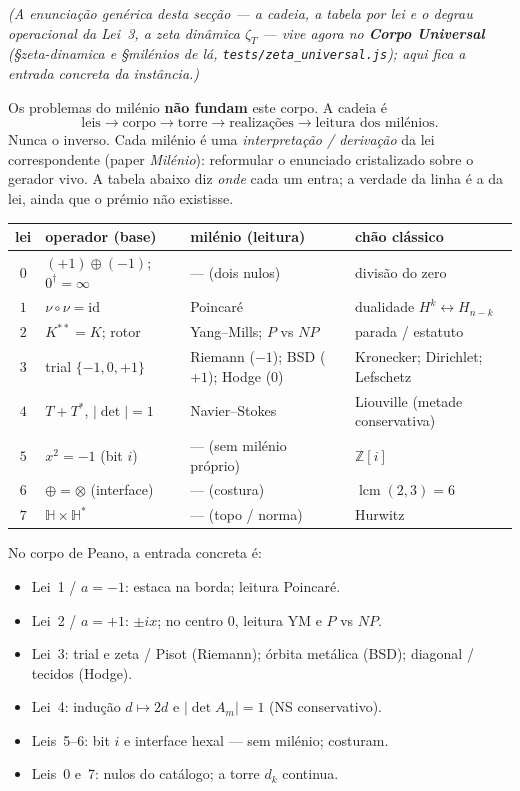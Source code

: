 \documentclass[11pt,a4paper]{article}
\newcommand{\code}[1]{\texttt{#1}}
\begin{document}
\noindent\emph{(A enunciação genérica desta secção --- a cadeia, a
tabela por lei e o degrau operacional da Lei~3, a zeta dinâmica
$\zeta_{T}$ --- vive agora no \textbf{Corpo Universal}
(\S zeta-dinamica e \S milénios de lá, \code{tests/zeta\_universal.js});
aqui fica a entrada concreta da instância.)}

Os problemas do milénio \textbf{não fundam} este corpo.
A cadeia é
\[\text{leis}\to\text{corpo}\to\text{torre}\to\text{realizações}\to\text{leitura dos milénios}.\]
Nunca o inverso. Cada milénio é uma \emph{interpretação / derivação}
da lei correspondente (paper \emph{Milénio}): reformular o enunciado
cristalizado sobre o gerador vivo.
A tabela abaixo diz \emph{onde} cada um entra; a verdade da linha é a
da lei, ainda que o prémio não existisse.

\begin{center}\small
\begin{tabular}{@{}clll@{}}
lei & operador (base) & milénio (leitura) & chão clássico \\
\hline
$0$ & $(+1)\oplus(-1)$; $0^{\dagger}=\infty$ & --- (dois nulos) & divisão do zero \\
$1$ & $\nu\circ\nu=\mathrm{id}$ & Poincaré & dualidade $H^{k}\!\leftrightarrow\!H_{n-k}$ \\
$2$ & $K^{**}=K$; rotor & Yang--Mills; $P$ vs $NP$ & parada / estatuto \\
$3$ & trial $\{-1,0,+1\}$ & Riemann ($-1$); BSD ($+1$); Hodge ($0$) & Kronecker; Dirichlet; Lefschetz \\
$4$ & $T+T^{*}$, $|\det|=1$ & Navier--Stokes & Liouville (metade conservativa) \\
$5$ & $x^{2}=-1$ (bit $i$) & --- (sem milénio próprio) & $\mathbb{Z}[i]$ \\
$6$ & $\oplus=\otimes$ (interface) & --- (costura) & $\operatorname{lcm}(2,3)=6$ \\
$7$ & $\mathbb{H}\times\mathbb{H}^{*}$ & --- (topo / norma) & Hurwitz \\
\end{tabular}
\end{center}

\noindent No corpo de Peano, a entrada concreta é:
\begin{itemize}
\item Lei~1 / $a=-1$: estaca na borda; leitura Poincaré.
\item Lei~2 / $a=+1$: $\pm ix$; no centro $0$, leitura YM e $P$ vs $NP$.
\item Lei~3: trial e zeta / Pisot (Riemann); órbita metálica (BSD);
diagonal / tecidos (Hodge).
\item Lei~4: indução $d\mapsto2d$ e $\lvert\det A_m\rvert=1$ (NS
conservativo).
\item Leis~5--6: bit $i$ e interface hexal --- sem milénio; costuram.
\item Leis~0 e~7: nulos do catálogo; a torre $d_k$ continua.
\end{itemize}
\end{document}
